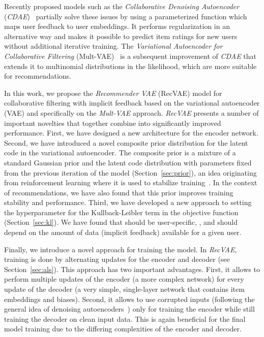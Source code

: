 \documentclass[sigconf,authorversion]{acmart}
\begin{document}
Recently proposed models such as the \emph{Collaborative Denoising Autoencoder} (\emph{CDAE})~\cite{wu2016collaborative} partially solve these issues by using a parameterized function which maps user feedback to user embeddings. It performs regularization in an alternative way and makes it possible to predict item ratings for new users without additional iterative training. The \emph{Variational Autoencoder for Collaborative Filtering} (Mult-VAE)~\cite{liang2018variational} is a subsequent improvement of \emph{CDAE} that extends it to multinomial distributions in the likelihood, which are more suitable for recommendations.

In this work, we propose the \emph{Recommender VAE} (RecVAE) model for collaborative filtering with implicit feedback based on the variational autoencoder (VAE) and specifically on the \emph{Mult-VAE} approach. \emph{RecVAE} presents a number of important novelties that together combine into significantly improved performance. First, we have designed a new architecture for the encoder network. Second, we have introduced a novel composite prior distribution for the latent code  in the variational autoencoder. The composite prior is a mixture of a standard Gaussian prior and the latent code distribution with parameters fixed from the previous iteration of the model (Section~\ref{sec:prior}), an idea originating from reinforcement learning where it is used to stabilize training~\cite{DBLP:journals/corr/SchulmanWDRK17,houthooft2016vime}. In the context of recommendations, we have also found that this prior improves training stability and performance. Third, we have developed a new approach to setting the hyperparameter  for the Kullback-Leibler term in the objective function (Section~\ref{sec:kl}). We have found that  should be user-specific, , and should depend on the amount of data (implicit feedback) available for a given user.

Finally, we introduce a novel approach for training the model. In \emph{RecVAE}, training is done by alternating updates for the encoder and decoder (see Section~\ref{sec:als}). This approach has two important advantages. First, it allows to perform multiple updates of the encoder (a more complex network) for every update of the decoder (a very simple, single-layer network that contains item embeddings and biases). Second, it allows to use corrupted inputs (following the general idea of denoising autoencoders~\cite{im2017denoising,shu2018amortized}) only for training the encoder while still training the decoder on clean input data. This is again beneficial for the final model training due to the differing complexities of the encoder and decoder. 
\end{document}
